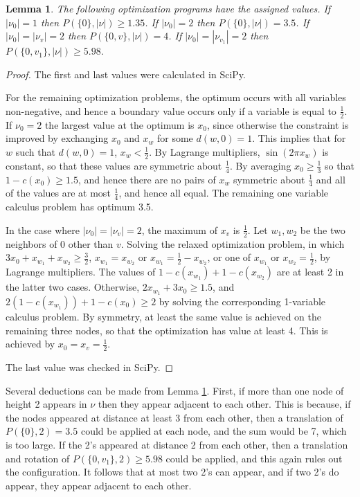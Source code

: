 \documentclass[a4paper, 12pt, notitlepage]{amsart}
\newtheorem{lemma}[theorem]{Lemma}
\theoremstyle{remark}
\begin{document}
 \begin{lemma}\label{height_2_lemma}
  The following optimization programs have the assigned values.  If $|\nu_0| = 1$ then $P(\{0\}, |\nu|) \geq 1.35$.  If $|\nu_0| = 2$ then $P(\{0\}, |\nu|) = 3.5$. If $|\nu_0| = |\nu_v| = 2$ then $P(\{0, v\}, |\nu|) = 4$.  If $|\nu_0| = |\nu_{v_1}| = 2$ then $P(\{0, v_1\}, |\nu|) \geq 5.98$.
 \end{lemma}
\begin{proof}
 The first and last values were calculated in SciPy. 
 
 For the remaining optimization problems, the optimum occurs with all variables non-negative, and hence a boundary value occurs only if a variable is equal to $\frac{1}{2}$.   If $\nu_0 = 2$ the largest value at the optimum is $x_0$, since otherwise the constraint is improved by exchanging $x_0$ and $x_w$ for some $d(w,0)=1$.  This implies that for $w$ such that $d(w,0)=1$, $x_w< \frac{1}{2}$.  By Lagrange multipliers, $\sin(2\pi x_w)$ is constant, so that these values are symmetric about $\frac{1}{4}$.  By averaging $x_0 \geq \frac{1}{3}$ so that $1-c(x_0) \geq 1.5$, and hence there are no pairs of $x_w$ symmetric about $\frac{1}{4}$ and all of the values are at most $\frac{1}{4}$, and hence all equal.  The remaining one variable calculus problem has optimum 3.5.  
 
 In the case where $|\nu_0| = |\nu_v| = 2$, the maximum of $x_v$ is $\frac{1}{2}$. Let $w_1, w_2$ be the two neighbors of 0 other than $v$. Solving the relaxed optimization problem, in which $3x_0 + x_{w_1} + x_{w_2} \geq \frac{3}{2}$,   $x_{w_1} = x_{w_2}$ or $x_{w_1} = \frac{1}{2} - x_{w_2}$, or one of $x_{w_1}$ or $x_{w_2} = \frac{1}{2}$, by Lagrange multipliers.  The values of $1 - c(x_{w_1}) + 1-c(x_{w_2})$ are at least 2 in the latter two cases.  Otherwise, $2x_{w_1} + 3 x_0 \geq 1.5$, and $2(1-c(x_{w_1})) + 1-c(x_0) \geq 2$ by solving the corresponding 1-variable calculus problem.  By symmetry, at least the same value is achieved on the remaining three nodes, so that the optimization has value at least 4.  This is achieved by $x_0 = x_v = \frac{1}{2}$.
 
 The last value was checked in SciPy.
 
 
\end{proof}
Several deductions can be made from Lemma \ref{height_2_lemma}.  First, if more than one node of height 2 appears in $\nu$ then they appear adjacent to each other.  This is because, if the nodes appeared at distance at least 3 from each other, then a translation of $P(\{0\}, 2) = 3.5$ could be applied at each node, and the sum would be 7, which is too large.  If the 2's appeared at distance 2 from each other, then a translation and rotation of $P(\{0,v_1\}, 2)\geq 5.98$ could be applied, and this again rules out the configuration.  It follows that at most two 2's can appear, and if two 2's do appear, they appear adjacent to each other. 
\end{document}
